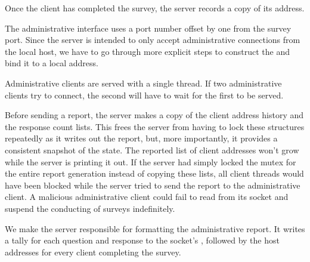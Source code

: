 \begin{topcode}
\begin{bottomcode}

Once the client has completed the survey, the server records a copy of
its address.

\end{bottomcode}


\begin{bottomcode}


The administrative interface uses a port number offset by one from the
survey port.  Since the server is intended to only accept
administrative connections from the local host, we have to go through
more explicit steps to construct the  and bind
it to a local address.


Administrative clients are served with a single thread.  If two
administrative clients try to connect, the second will have
to wait for the first to be served.


Before sending a report, the server makes a copy of the client address
history and the response count lists.  This frees the server from
having to lock these structures repeatedly as it writes out the
report, but, more importantly, it provides a consistent snapshot of
the state.  The reported list of client addresses won't grow while the
server is printing it out.  If the server had simply locked the mutex
for the entire report generation instead of copying these lists, all
client threads would have been blocked while the server tried to send
the report to the administrative client.  A malicious administrative
client could fail to read from its socket and suspend the conducting
of surveys indefinitely.


We make the server responsible for formatting the administrative
report.  It writes a tally for each question and response to the
socket's , followed by the host addresses for every
client completing the survey.

\end{bottomcode}

\end{topcode}

